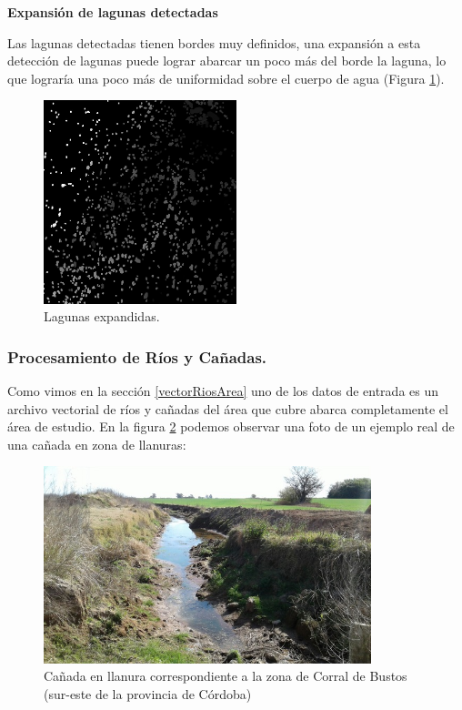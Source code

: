 \documentclass[10pt,a4paper, twoside]{report}
\begin{document}
\textbf{Expansión de lagunas detectadas}

Las lagunas detectadas tienen bordes muy definidos, una expansión a esta detección de lagunas puede lograr abarcar un poco más del borde la laguna, lo que lograría una poco más de uniformidad sobre el cuerpo de agua (Figura \ref{dilationLagoons}).

\begin{figure}[H]
   \centering      
   \includegraphics[width=0.5\textwidth]{imagenes/dilationLagoons.jpg}
 \caption{Lagunas expandidas.}
 \label{dilationLagoons}
\end{figure}		


\subsubsection{Procesamiento de Ríos y Cañadas.}

Como vimos en la sección \ref{vectorRiosArea} uno de los datos de entrada es un archivo vectorial de ríos y cañadas del área que cubre abarca completamente el área de estudio. En la figura \ref{caniada} podemos observar una foto de un ejemplo real de una cañada en zona de llanuras:

\begin{figure}[H]
   \centering      
   \includegraphics[width=0.85\textwidth]{imagenes/caniada.jpg}
 \caption{Cañada en llanura correspondiente a la zona de Corral de Bustos (sur-este de la provincia de Córdoba)}
 \label{caniada}
\end{figure}
\end{document}
